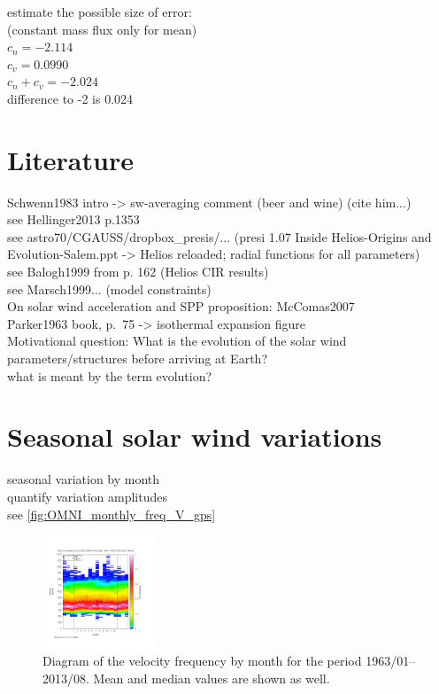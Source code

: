 estimate the possible size of error:\\
(constant mass flux only for mean)\\
$c_n = -2.114$\\
$c_v = 0.0990$\\
$c_n + c_v = -2.024$\\
difference to -2 is 0.024\\



\section{Literature}
Schwenn1983 intro -> sw-averaging comment (beer and wine) (cite him...)\\
see Hellinger2013 p.1353\\
see astro70/CGAUSS/dropbox\_presis/... (presi 1.07 Inside Helios-Origins and Evolution-Salem.ppt -> Helios reloaded; radial functions for all parameters)\\
see Balogh1999 from p. 162 (Helios CIR results)\\
see Marsch1999... (model constraints)\\
On solar wind acceleration and SPP proposition: McComas2007\\
Parker1963 book, p.~75 -> isothermal expansion figure\\	%

Motivational question: What is the evolution of the solar wind parameters/structures before arriving at Earth?\\
what is meant by the term evolution?\\


\section{Seasonal solar wind variations}
seasonal variation by month\\
quantify variation amplitudes\\

see \autoref{fig:OMNI_monthly_freq_V_gps}
\begin{figure}[htb]
	\centering
	\includegraphics[width=0.3\textwidth]{figures_of_mine/gnuplots/OMNI_monthly_freq_V_gps.png}
	\caption{Diagram of the velocity frequency by month for the period 1963/01--2013/08. Mean and median values are shown as well.}
	\label{fig:OMNI_monthly_freq_V_gps}
\end{figure}

